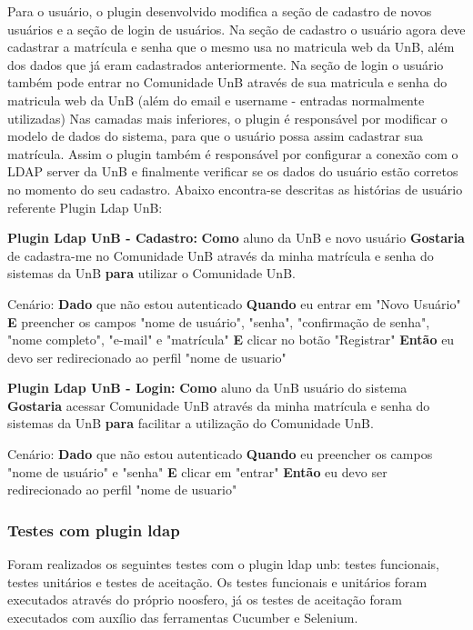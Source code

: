 %
Para o usuário, o plugin desenvolvido modifica a seção de cadastro de novos usuários 
e a seção de login de usuários. Na seção de cadastro o usuário agora deve cadastrar a 
matrícula e senha que o mesmo usa no matricula web da UnB, além dos dados que já eram 
cadastrados anteriormente. Na seção de login o usuário também pode entrar no Comunidade 
UnB através de sua matricula e senha do matricula web da UnB (além do email e username 
- entradas normalmente utilizadas)
%
Nas camadas mais inferiores, o plugin é responsável por modificar o modelo de dados do 
sistema, para que o usuário possa assim cadastrar sua matrícula. Assim o plugin também é responsável por configurar a conexão com o LDAP server da UnB e finalmente verificar se 
os dados do usuário estão corretos no momento do seu cadastro. Abaixo encontra-se descritas as histórias de usuário referente Plugin Ldap UnB:

\textbf{Plugin Ldap UnB - Cadastro:}
\textbf{Como} aluno da UnB e novo usuário
\textbf{Gostaria} de cadastra-me no Comunidade UnB através da minha matrícula e senha do sistemas da UnB
\textbf{para} utilizar o Comunidade UnB.

Cenário:
\textbf{Dado} que não estou autenticado
\textbf{Quando} eu entrar em "Novo Usuário"
\textbf{E} preencher os campos "nome de usuário", "senha", "confirmação de senha", "nome completo", "e-mail" e "matrícula"
\textbf{E} clicar no botão "Registrar"
\textbf{Então} eu devo ser redirecionado ao perfil "nome de usuario"

\textbf{Plugin Ldap UnB - Login:}
\textbf{Como} aluno da UnB usuário do sistema
\textbf{Gostaria} acessar Comunidade UnB através da minha matrícula e senha do sistemas da UnB
\textbf{para} facilitar a utilização do Comunidade UnB.

Cenário:
\textbf{Dado} que não estou autenticado
\textbf{Quando} eu preencher os campos "nome de usuário" e "senha"
\textbf{E} clicar em "entrar"
\textbf{Então} eu devo ser redirecionado ao perfil "nome de usuario"

\subsubsection{Testes com plugin ldap}
%
Foram realizados os seguintes testes  com o plugin ldap unb: testes funcionais, testes 
unitários e testes de aceitação. Os testes funcionais e unitários foram executados através 
do próprio noosfero, já os testes de aceitação foram executados com auxílio das ferramentas Cucumber e Selenium.
%
